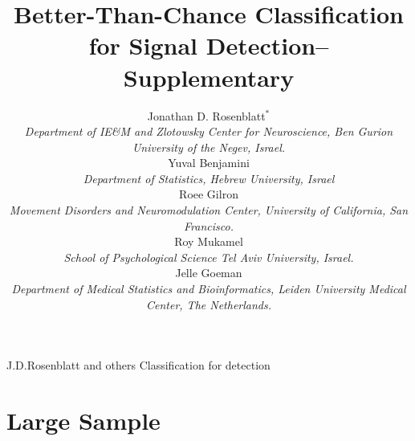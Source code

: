 \documentclass[]{bio}
\begin{document}
\title{Better-Than-Chance Classification for Signal Detection-- Supplementary}

\author{Jonathan D. Rosenblatt$^\ast$ \\ 
	\textit{Department of IE\&M and Zlotowsky Center for Neuroscience, 
		Ben Gurion University of the Negev, Israel.} 
	\\ Yuval Benjamini \\
	\textit{Department of Statistics, Hebrew University, Israel}	
	\\ Roee Gilron \\ 
	\textit{Movement Disorders and Neuromodulation Center, University of California, San Francisco.}
	\\ Roy Mukamel \\ 
	\textit{School of Psychological Science Tel Aviv University, Israel.}
	\\ Jelle Goeman \\ 
	\textit{Department of Medical Statistics and Bioinformatics, Leiden University Medical Center, The Netherlands.}
}


\markboth%
{J.D.Rosenblatt and others}
{Classification for detection}

\maketitle



\section{Large Sample}
\end{document}
